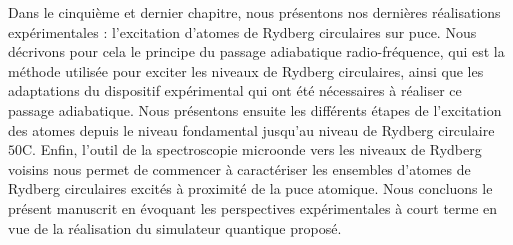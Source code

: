 Dans le cinquième et dernier chapitre, nous présentons nos dernières réalisations expérimentales : l'excitation d'atomes de Rydberg circulaires sur puce.
Nous décrivons pour cela le principe du passage adiabatique radio-fréquence, qui est la méthode utilisée pour exciter les niveaux de Rydberg circulaires, ainsi que les adaptations du dispositif expérimental qui ont été nécessaires à réaliser ce passage adiabatique.
Nous présentons ensuite les différents étapes de l'excitation des atomes depuis le niveau fondamental jusqu'au niveau de Rydberg circulaire $\mathrm{50C}$.
Enfin, l'outil de la spectroscopie microonde vers les niveaux de Rydberg voisins nous permet de commencer à caractériser les ensembles d'atomes de Rydberg circulaires excités à proximité de la puce atomique.
Nous concluons le présent manuscrit en évoquant les perspectives expérimentales à court terme en vue de la réalisation du simulateur quantique proposé.




